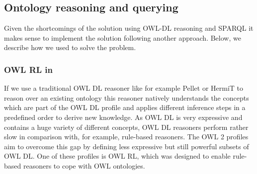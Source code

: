 \subsection{Ontology reasoning and querying}
Given the shortcomings of the solution using OWL-DL reasoning and SPARQL it makes sense to implement the solution following another approach. 
Below, we describe how we used \nthreelogic to solve the problem.

\subsubsection{OWL RL in \nthree}
If we use a traditional OWL DL reasoner like for example Pellet \cite{Pellet} or HermiT \cite{hermit} to reason over an existing ontology 
this reasoner 
natively understands the concepts which are part of the OWL DL profile and applies 
different inference steps in a predefined order to derive new knowledge. %
%  
% 
% 
% 
% 
% 
As OWL DL is very expressive and contains a huge variety of different concepts, OWL DL reasoners perform rather slow in comparison with, for example, rule-based reasoners. 
The OWL 2 profiles \cite{OWLRL} aim to overcome this gap 
by defining less expressive
but still powerful subsets of OWL DL. One of these profiles is OWL RL, which was designed to enable rule-based reasoners to cope with OWL ontologies. 

